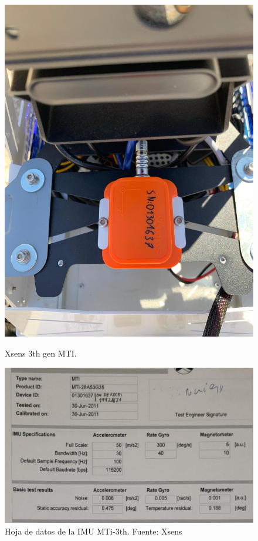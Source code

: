 \begin{figure}[!htb]
  \centering
  \begin{minipage}[b]{0.35\textwidth}
    \centering
    \includegraphics[width=\textwidth]{images/xsens.jpeg}
    \caption{Xsens 3th gen MTI.}
    \label{fig:xsens_imu}
  \end{minipage}
  \hfill
  \begin{minipage}[b]{0.5\textwidth}
    \centering
    \includegraphics[width=\textwidth]{images/datasheet_mti.png}
    \caption{Hoja de datos de la IMU MTi-3th. Fuente: Xsens}
    \label{fig:xsens_datasheet}
  \end{minipage}
\end{figure}
